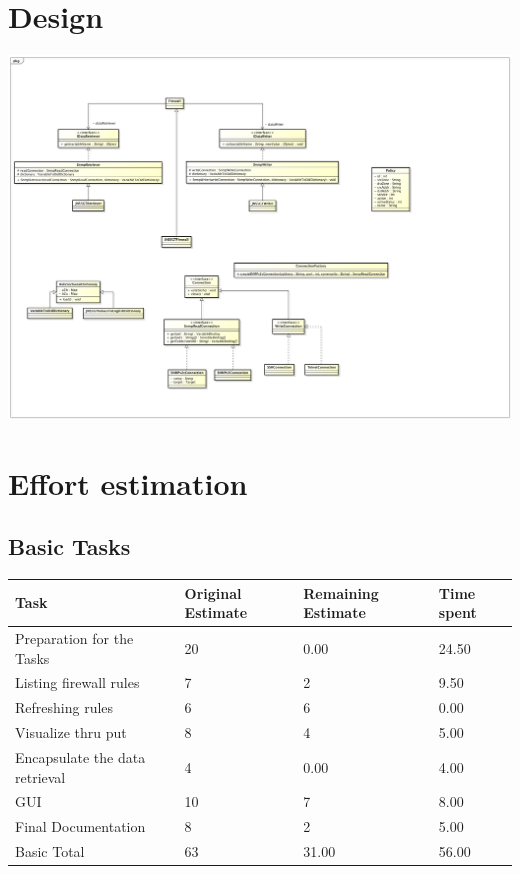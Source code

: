 \documentclass[11pt, a4paper]{article}
\begin{document}
\section{Design}
\includegraphics[width=\textwidth]{images/uml}
 
\section{Effort estimation}

\subsection{Basic Tasks}
\begin{tabular} {| l | l | l | l |} \hline
Task &	Original Estimate & Remaining Estimate & Time spent \\ \hline
Preparation for the Tasks &	20 &	0.00 & 24.50 \\ \hline
Listing firewall rules &	7 &	2 &	9.50 \\ \hline
Refreshing rules &	6 &	6 &	0.00 \\ \hline
Visualize thru put & 8 &	4 &	5.00 \\ \hline
Encapsulate the data retrieval &	4	& 0.00 &	4.00 \\ \hline
GUI	 & 10 &	7 &	8.00 \\ \hline
Final Documentation  &	8	& 2	& 5.00 \\ \hline
Basic Total	& 63 &	31.00 &	56.00 \\ \hline
\end{tabular}
\end{document}
